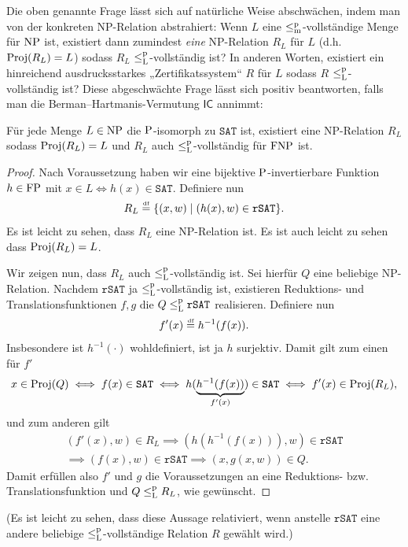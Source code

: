 Die oben genannte Frage lässt sich auf natürliche Weise abschwächen, indem man von der konkreten NP-Relation abstrahiert: Wenn $L$ eine $\leqmp$-vollständige Menge für $\NP$ ist, existiert dann zumindest \emph{eine} NP-Relation $R_L$ für $L$ (d.h. $\Proj(R_L)=L$) sodass $R_L$ $\leqlp$-vollständig ist? In anderen Worten, existiert ein hinreichend ausdrucksstarkes „Zertifikatssystem“ $R$ für $L$ sodass $R$ $\leqlp$-vollständig ist?
Diese abgeschwächte Frage lässt sich positiv beantworten, falls man die Berman–Hartmanis-Vermutung $\mathsf{IC}$ annimmt:
\begin{observation}\label{obs:isomorphs-sind-leqlp-vollst}
    Für jede Menge $L\in \NP$ die $\P$-isomorph zu $\mathtt{SAT}$ ist, existiert eine NP-Relation $R_L$ sodass $\Proj(R_L)=L$ und $R_L$ auch $\leqlp$-vollständig für $\FNP$ ist.
\end{observation}
\begin{proof}
    Nach Voraussetzung haben wir eine bijektive $\P$-invertierbare Funktion $h\in\FP$ mit $x\in L \iff h(x) \in \mathtt{SAT}$.
    Definiere nun
    \[ R_L \defeq \{ (x,w) \mid (h(x), w)\in \mathtt{rSAT}\}. \]
    Es ist leicht zu sehen, dass $R_L$ eine NP-Relation ist. Es ist auch leicht zu sehen dass $\Proj(R_L)=L$.

    Wir zeigen nun, dass $R_L$ auch $\leqlp$-vollständig ist. Sei hierfür $Q$ eine beliebige NP-Relation. Nachdem $\mathtt{rSAT}$ ja $\leqlp$-vollständig ist, existieren Reduktions- und Translationsfunktionen $f,g$ die $Q\leqlp \mathtt{rSAT}$ realisieren.
    Definiere nun
    \[ f'(x) \defeq h^{-1}(f(x)). \]
    Insbesondere ist $h^{-1}(\cdot)$ wohldefiniert, ist ja $h$ surjektiv.
    Damit gilt zum einen für $f'$
    \[ x\in \Proj(Q) \iff f(x) \in \mathtt{SAT} \iff h(\underbrace{h^{-1}(f(x))}_{f'(x)}) \in \mathtt{SAT} \iff f'(x) \in \Proj(R_L), \]
    und zum anderen gilt
    \begin{gather*} (f'(x), w) \in R_L \implies (h(h^{-1}(f(x))), w)\in \mathtt{rSAT} \\\implies (f(x), w)\in \mathtt{rSAT} \implies (x, g(x, w))\in Q.  \end{gather*}
    Damit erfüllen also $f'$ und $g$ die Voraussetzungen an eine Reduktions- bzw. Translationsfunktion und $Q\leqlp R_L$, wie gewünscht.
\end{proof}
(Es ist leicht zu sehen, dass diese Aussage relativiert, wenn anstelle $\mathtt{rSAT}$ eine andere beliebige $\leqlp$-vollständige Relation $R$ gewählt wird.)

